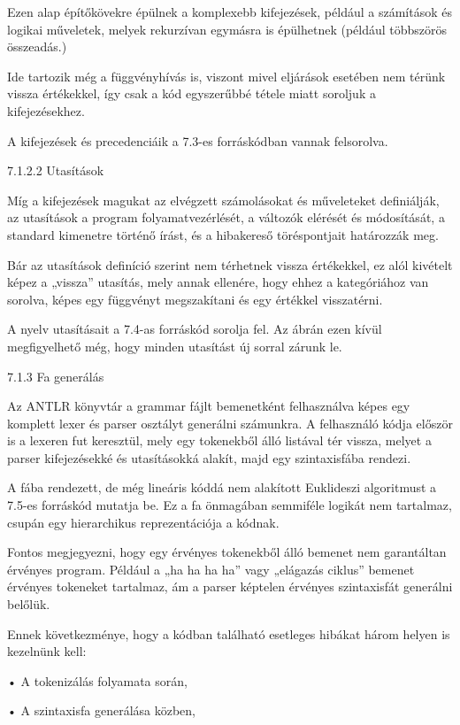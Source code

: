 Ezen alap építőkövekre épülnek a komplexebb kifejezések, például a számítások és logikai műveletek, melyek rekurzívan egymásra is épülhetnek (például többszörös összeadás.) 

Ide tartozik még a függvényhívás is, viszont mivel eljárások esetében nem térünk vissza értékekkel, így csak a kód egyszerűbbé tétele miatt soroljuk a kifejezésekhez.

A kifejezések és precedenciáik a 7.3-es forráskódban vannak felsorolva.

7.1.2.2 Utasítások

Míg a kifejezések magukat az elvégzett számolásokat és műveleteket definiálják, az utasítások a program folyamatvezérlését, a változók elérését és módosítását, a standard kimenetre történő írást, és a hibakereső töréspontjait határozzák meg.

Bár az utasítások definíció szerint nem térhetnek vissza értékekkel, ez alól kivételt képez a „vissza” utasítás, mely annak ellenére, hogy ehhez a kategóriához van sorolva, képes egy függvényt megszakítani és egy értékkel visszatérni.

A nyelv utasításait a 7.4-as forráskód sorolja fel. Az ábrán ezen kívül megfigyelhető még, hogy minden utasítást új sorral zárunk le.

7.1.3 Fa generálás

Az ANTLR könyvtár a grammar fájlt bemenetként felhasználva képes egy komplett lexer és parser osztályt generálni számunkra. A felhasználó kódja először is a lexeren fut keresztül, mely egy tokenekből álló listával tér vissza, melyet a parser kifejezésekké és utasításokká alakít, majd egy szintaxisfába rendezi.



A fába rendezett, de még lineáris kóddá nem alakított Euklideszi algoritmust a 7.5-es forráskód mutatja be. Ez a fa önmagában semmiféle logikát nem tartalmaz, csupán egy hierarchikus reprezentációja a kódnak.

Fontos megjegyezni, hogy egy érvényes tokenekből álló bemenet nem garantáltan érvényes program. Például a „ha ha ha ha” vagy „elágazás ciklus” bemenet érvényes tokeneket tartalmaz, ám a parser képtelen érvényes szintaxisfát generálni belőlük.

Ennek következménye, hogy a kódban található esetleges hibákat három helyen is kezelnünk kell:

    • A tokenizálás folyamata során,

    • A szintaxisfa generálása közben,


